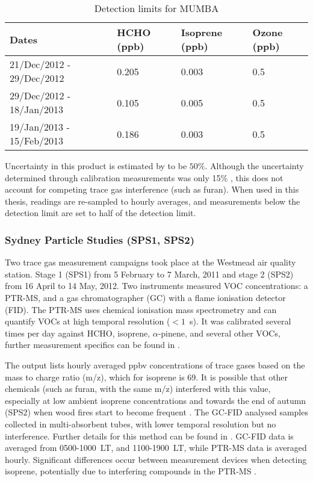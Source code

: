       
      \begin{table}
        \caption{Detection limits for MUMBA}
        \begin{tabular}{  l |  l  l  l }
          
          \textbf{Dates} & \textbf{HCHO (ppb)} & \textbf{Isoprene (ppb)} & \textbf{Ozone (ppb)}
          \\ \hline
          21/Dec/2012 - 29/Dec/2012 & 0.205 & 0.003 & 0.5 \\
          29/Dec/2012 - 18/Jan/2013 & 0.105 & 0.005 & 0.5 \\
          19/Jan/2013 - 15/Feb/2013 & 0.186 & 0.003 & 0.5 \\
        \end{tabular}
        \label{Model:datasets:MUMBA:tab_detectionlimits}
      \end{table}
      
      Uncertainty in this product is estimated by \textcite{Dunne2018} to be $50\%$.
      Although the uncertainty determined through calibration measurements was only 15\% \parencite{Guerette2018}, this does not account for competing trace gas interference (such as furan).
      When used in this thesis, readings are re-sampled to hourly averages, and measurements below the detection limit are set to half of the detection limit.
    
    \subsubsection{Sydney Particle Studies (SPS1, SPS2)}
    \label{Model:datasets:SPS}
      Two trace gas measurement campaigns took place at the Westmead air quality station. %
      Stage 1 (SPS1) from 5 February to 7 March, 2011 and stage 2 (SPS2) from 16 April to 14 May, 2012.
      Two instruments measured VOC concentrations: a PTR-MS, and a gas chromatographer (GC) with a flame ionisation detector (FID).
      The PTR-MS uses chemical ionisation mass spectrometry and can quantify VOCs at high temporal resolution ($< 1$~s).
      It was calibrated several times per day against HCHO, isoprene, $\alpha$-pinene, and several other VOCs, further measurement specifics can be found in \textcite{Dunne2018}.
      
      The output lists hourly averaged ppbv concentrations of trace gases based on the mass to charge ratio (m/z), which for isoprene is 69.
      It is possible that other chemicals (such as furan, with the same m/z) interfered with this value, especially at low ambient isoprene concentrations and towards the end of autumn (SPS2) when wood fires start to become frequent \parencite{Guerette2018}.
      The GC-FID analysed samples collected in multi-absorbent tubes, with lower temporal resolution but no interference. 
      Further details for this method can be found in \textcite{Cheng2016}.
      GC-FID data is averaged from 0500-1000~LT, and 1100-1900~LT, while PTR-MS data is averaged hourly.
      Significant differences occur between measurement devices when detecting isoprene, potentially due to interfering compounds in the PTR-MS \parencite{Dunne2018}.
      
